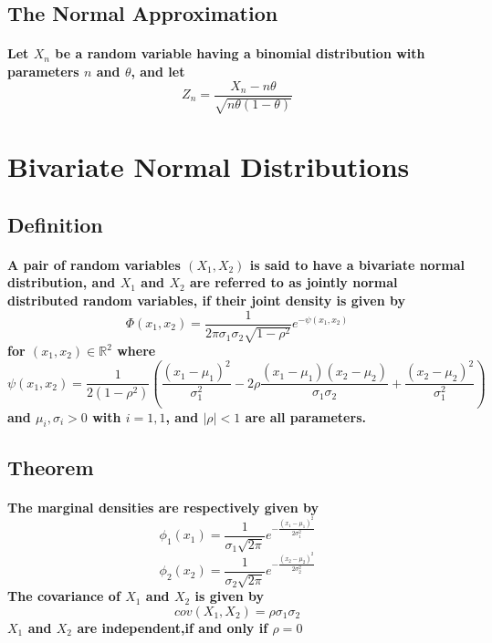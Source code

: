 \documentclass[titlepage]{article}
\begin{document}
        \subsection{The Normal Approximation}
            \paragraph{
                Let $X_n$ be a random variable having a binomial distribution with parameters $n$ and $\theta$, and let $$Z_n=\frac{X_n-n\theta}{\sqrt{n\theta(1-\theta)}}$$
            }
    \section{Bivariate Normal Distributions}
        \subsection*{Definition}
            \paragraph{
                A pair of random variables $(X_1,X_2)$ is said to have a bivariate normal distribution, and $X_1$ and $X_2$ are referred to as jointly normal distributed random variables, if their joint density is given by 
                $$\Phi(x_1,x_2)=\frac{1}{2\pi\sigma_1\sigma_2\sqrt{1-\rho^2}}e^{-\psi(x_1,x_2)}$$
                for $(x_1,x_2)\in \mathbb{R}^2$
                where
                $$\psi(x_1,x_2)=\frac{1}{2(1-\rho^2)}(\frac{(x_1-\mu_1)^2}{\sigma_1^2}-2\rho\frac{(x_1-\mu_1)(x_2-\mu_2)}{\sigma_1\sigma_2}+\frac{(x_2-\mu_2)^2}{\sigma_1^2})$$and $\mu_i,\sigma_i>0$ with $i=1,1$, and $|\rho|<1$ are all parameters.
            }
        \subsection*{Theorem}
            \paragraph{
                The marginal densities are respectively given by 
                $$\phi_1(x_1)=\frac{1}{\sigma_1\sqrt{2\pi}}e^{-\frac{(x_1-\mu_1)^2}{2\sigma_1^2}}$$
                $$\phi_2(x_2)=\frac{1}{\sigma_2\sqrt{2\pi}}e^{-\frac{(x_2-\mu_2)^2}{2\sigma_2^2}}$$
                The covariance of $X_1$ and $X_2$ is given by 
                $$cov(X_1,X_2)=\rho\sigma_1\sigma_2$$    
                $X_1$ and $X_2$ are independent,if and only if $\rho=0$
            }
\end{document}
